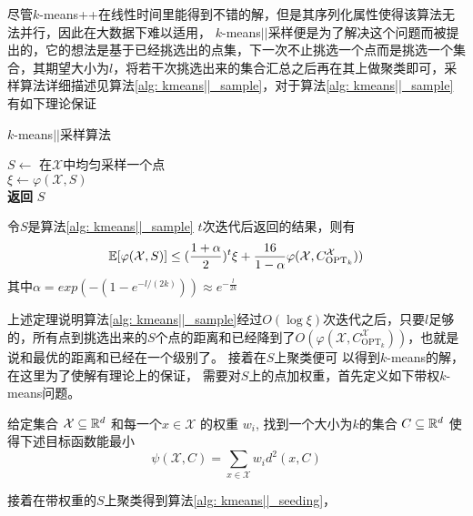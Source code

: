 尽管$k$-means++在线性时间里能得到不错的解，但是其序列化属性使得该算法无法并行，因此在大数据下难以适用， $k$-means\(\vert \vert\)采样便是为了解决这个问题而被提出的，它的想法是基于已经挑选出的点集，下一次不止挑选一个点而是挑选一个集合，其期望大小为$l$，将若干次挑选出来的集合汇总之后再在其上做聚类即可，采样算法详细描述见算法\ref{alg: kmeans||_sample}，对于算法\ref{alg: kmeans||_sample}有如下理论保证
\begin{algorithm}[H]
    \caption{$k$-means\(\vert \vert\)采样算法}\label{alg: kmeans||_sample}
    $S \gets$ 在$\mathcal{X}$中均匀采样一个点 \\
    $\xi \gets \varphi(\mathcal{X},S)$ \\
    \textbf{返回} $S$
\end{algorithm}
\begin{theorem}
    \label{theo: kmeans||_performance_1}
    令$S$是算法\ref{alg: kmeans||_sample} $t$次迭代后返回的结果，则有
    \begin{equation*}
    \mathbb{E}[\varphi(\mathcal{X},S)] \leq (\frac{1+\alpha}{2})^t \xi + \frac{16}{1-\alpha}\varphi(\mathcal{X},C_{\text{OPT}_k}^{\mathcal{X}}))
    \end{equation*}
    其中$\alpha=exp(-(1-e^{-l/(2k)})) \approx e^{-\frac{l}{2k}}$
\end{theorem}
上述定理说明算法\ref{alg: kmeans||_sample}经过$O(\log \xi)$次迭代之后，只要$l$足够的，所有点到挑选出来的$S$个点的距离和已经降到了$O(\varphi(\mathcal{X},C_{\text{OPT}_k}^\mathcal{X}))$，也就是说和最优的距离和已经在一个级别了。 接着在$S$上聚类便可
以得到$k$-means的解， 在这里为了使解有理论上的保证， 需要对$S$上的点加权重，首先定义如下带权$k$-means问题。
\begin{definition}[带权$k$-means问题]
    \label{def: weighted_kmeans}
    给定集合 $\mathcal{X} \subseteq \mathbb{R}^d$ 和每一个$x \in \mathcal{X}$ 的权重 $w_i$, 找到一个大小为$k$的集合 $C \subseteq \mathbb{R}^d$ 使得下述目标函数能最小
    \begin{equation*}
        \psi(\mathcal{X},C) = \sum_{x \in \mathcal{X}}w_i d^2 (x,C)
    \end{equation*}
\end{definition}
接着在带权重的$S$上聚类得到算法\ref{alg: kmeans||_seeding}，

